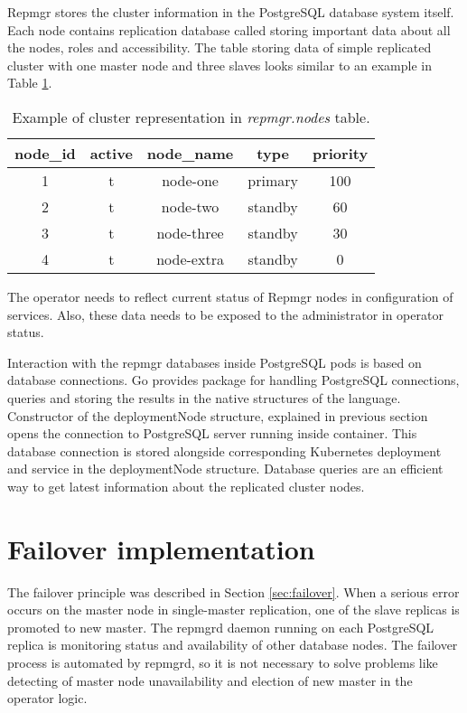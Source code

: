 \documentclass[
  digital, %
  twoside, %
  table,   %
  lof,     %
  lot,     %
]{fithesis3}
\begin{document}
Repmgr stores the cluster information in the PostgreSQL database system itself. Each node contains replication database called  storing important data about all the nodes, roles and accessibility. The table storing data of simple replicated cluster with one master node and three slaves looks similar to an example in Table \ref{table:repmgr_nodes}.

\begin{table}[ht!]
\centering
\begin{tabular}{|c c c c c|}
 \hline
 node\_id & active & node\_name & type & priority \\ [0.5ex]
 \hline
 1 & t & node-one & primary & 100 \\

 2 & t & node-two & standby & 60 \\

 3 & t & node-three & standby & 30 \\

 4 & t & node-extra & standby & 0 \\ [1ex]
 \hline
\end{tabular}
\caption{Example of cluster representation in \textit{repmgr.nodes} table.}
\label{table:repmgr_nodes}
\end{table}


The operator needs to reflect current status of Repmgr nodes in configuration of services. Also, these data needs to be exposed to the administrator in operator status.

Interaction with the repmgr databases inside PostgreSQL pods is based on database connections. Go provides package for handling PostgreSQL connections, queries and storing the results in the native structures of the language. Constructor of the deploymentNode structure, explained in previous section opens the connection to PostgreSQL server running inside container. This database connection is stored alongside corresponding Kubernetes deployment and service in the deploymentNode structure. Database queries are an efficient way to get latest information about the replicated cluster nodes.

\section{Failover implementation}
The failover principle was described in Section \ref{sec:failover}. When a serious error occurs on the master node in single-master replication, one of the slave replicas is promoted to new master. The repmgrd daemon running on each PostgreSQL replica is monitoring status and availability of other database nodes. The failover process is automated by repmgrd, so it is not necessary to solve problems like detecting of master node unavailability and election of new master in the operator logic.
\end{document}
